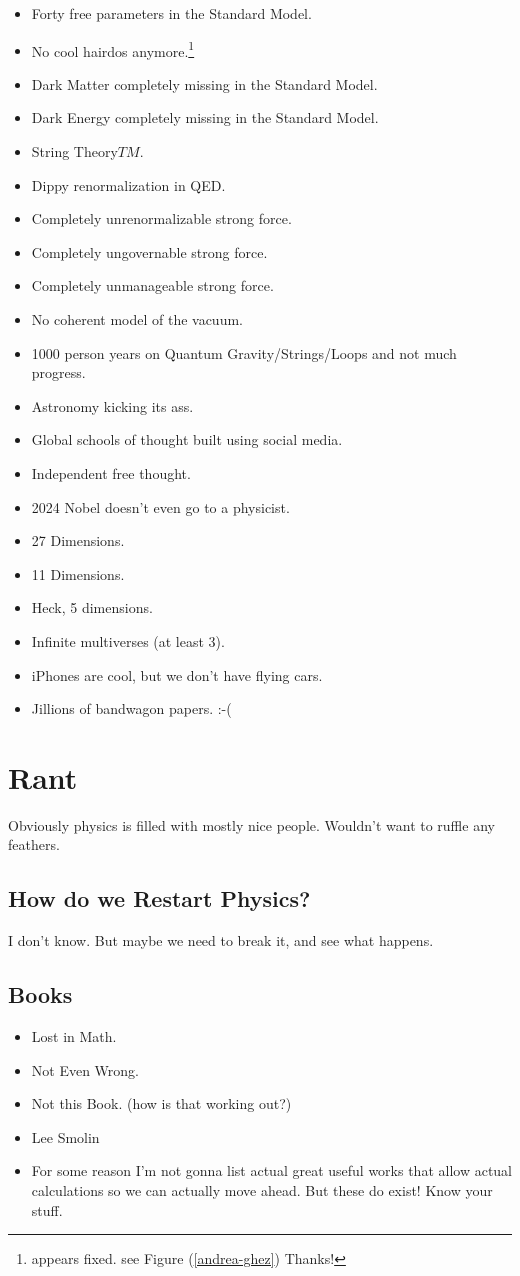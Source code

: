 \documentclass[../rzero]{subfiles}
\begin{document}
\begin{itemize}
  \item Forty free parameters in the Standard Model.
  \item No cool hairdos anymore.\footnote{appears fixed. see Figure (\ref{andrea-ghez}) Thanks!}
  \item Dark Matter completely missing in the Standard Model.
  \item Dark Energy completely missing in the Standard Model.
  \item String Theory${TM}$.
  \item Dippy renormalization in QED.
  \item Completely unrenormalizable strong force.
  \item Completely ungovernable strong force.
  \item Completely unmanageable strong force.
  \item No coherent model of the vacuum.
  \item 1000 person years on Quantum Gravity/Strings/Loops and not much progress.
  \item Astronomy kicking its ass.
  \item Global schools of thought built using social media.
  \item Independent free thought.
  \item 2024 Nobel doesn't even go to a physicist.
  \item 27 Dimensions.
  \item 11 Dimensions.
  \item Heck, 5 dimensions.
  \item Infinite multiverses (at least 3).
  \item iPhones are cool, but we don't have flying cars.
  \item Jillions of bandwagon papers. :-(
\end{itemize}

\section{Rant}
Obviously physics is filled with mostly nice people. Wouldn't want to ruffle any feathers.

\subsection{How do we Restart Physics?}
I don't know. But maybe we need to break it, and see what happens.
\subsection{Books}
\begin{itemize}
  \item Lost in Math.
  \item Not Even Wrong.
  \item Not this Book. (how is that working out?)
  \item Lee Smolin
  \item For some reason I'm not gonna list actual great useful works that allow actual calculations so we can actually move ahead. But these do exist! Know your stuff.
\end{itemize}
\end{document}
